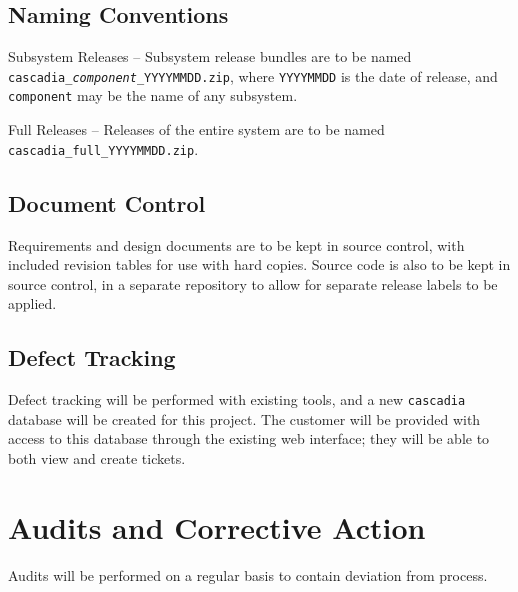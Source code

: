 \documentclass[11pt]{wacomepd}
\begin{document}
\section{Naming Conventions}
{\sc Subsystem Releases} -- Subsystem release bundles are to be named
{\tt cascadia\_\textit{component}\_YYYYMMDD.zip}, where {\tt YYYYMMDD} is the date of release,
and {\tt component} may be the name of any subsystem.

{\sc Full Releases} -- Releases of the entire system are to be named
\texttt{cascadia\_full\_YYYYMMDD.zip}.


\section{Document Control}
Requirements and design documents are to be kept in source control, with included revision tables
for use with hard copies.  Source code is also to be kept in source control, in a separate
repository to allow for separate release labels to be applied.


\section{Defect Tracking}
Defect tracking will be performed with existing tools, and a new {\tt cascadia} database will be
created for this project.  The customer will be provided with access to this database through the
existing web interface; they will be able to both view and create tickets.


\chapter{Audits and Corrective Action}

Audits will be performed on a regular basis to contain deviation from process.
\end{document}
